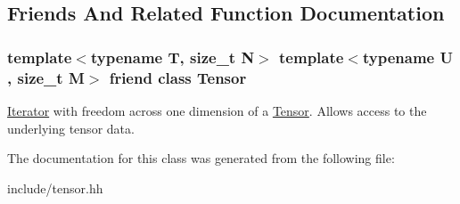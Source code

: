 \subsection{Friends And Related Function Documentation}
\subsubsection[{\texorpdfstring{Tensor}{Tensor}}]{\setlength{\rightskip}{0pt plus 5cm}template$<$typename T, size\+\_\+t N$>$ template$<$typename U , size\+\_\+t M$>$ friend class {\bf Tensor}\hspace{0.3cm}{\ttfamily [friend]}}\hypertarget{classtensor_1_1Tensor_1_1Iterator_af4a07134de1525172d3c60c57e8f1496}{}\label{classtensor_1_1Tensor_1_1Iterator_af4a07134de1525172d3c60c57e8f1496}
\hyperlink{classtensor_1_1Tensor_1_1Iterator}{Iterator} with freedom across one dimension of a \hyperlink{classtensor_1_1Tensor}{Tensor}. Allows access to the underlying tensor data. 

The documentation for this class was generated from the following file\+:\begin{DoxyCompactItemize}
\item 
include/tensor.\+hh\end{DoxyCompactItemize}
